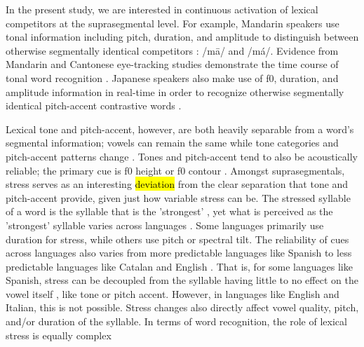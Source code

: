 In the present study, we are interested in continuous activation of lexical competitors at the suprasegmental level. For example, Mandarin speakers use tonal information including pitch, duration, and amplitude to distinguish between otherwise segmentally identical competitors \citep{Lee2008, Zhang2022, fox_1985}: /m\=a/ and /m\'a/. Evidence from Mandarin and Cantonese eye-tracking studies demonstrate the time course of tonal word recognition \citep{zou_2022, qin_2022, Nixon2016}. Japanese speakers also make use of f0, duration, and amplitude information in real-time in order to recognize otherwise segmentally identical pitch-accent contrastive words \citep{goss_2014, Cutler1999, Ito2024}.

Lexical tone and pitch-accent, however, are both heavily separable from a word's segmental information; vowels can remain the same while tone categories and pitch-accent patterns change \citep{Zeng2017}. Tones and pitch-accent tend to also be acoustically reliable; the primary cue is f0 height or f0 contour \citep{goss_2014}. Amongst suprasegmentals, stress serves as an interesting \hl{deviation} from the clear separation that tone and pitch-accent provide, given just how variable stress can be. The stressed syllable of a word is the syllable that is the 'strongest' \citep{sluijter1996spectral}, yet what is perceived as the 'strongest' syllable varies across languages \citep{Cutler1988}. Some languages primarily use duration for stress, while others use pitch or spectral tilt. The reliability of cues across languages also varies from more predictable languages like Spanish to less predictable languages like Catalan and English \citep{ortega_2011, beckman_1994}. That is, for some languages like Spanish, stress can be decoupled from the syllable having little to no effect on the vowel itself \citep{ortega_2011}, like tone or pitch accent. However, in languages like English and Italian, this is not possible. Stress changes also directly affect vowel quality, pitch, and/or duration of the syllable. In terms of word recognition, the role of lexical stress is equally complex \citep{cutler2001voornaam, Reinisch2010}

